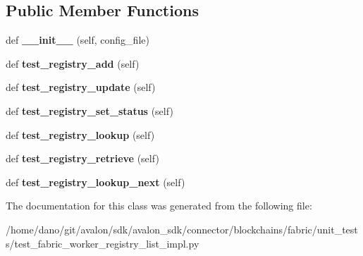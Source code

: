 \subsection*{Public Member Functions}
\begin{DoxyCompactItemize}
\item 
\mbox{\label{classtest__fabric__worker__registry__list__impl_1_1TestFabricWorkerRegistryListImpl_a9442afa1ac61c8fa028e240b4bf49cb9}} 
def {\bfseries \+\_\+\+\_\+init\+\_\+\+\_\+} (self, config\+\_\+file)
\item 
\mbox{\label{classtest__fabric__worker__registry__list__impl_1_1TestFabricWorkerRegistryListImpl_a1f13f2fd74a9d6fd582e77a40f3eaf6f}} 
def {\bfseries test\+\_\+registry\+\_\+add} (self)
\item 
\mbox{\label{classtest__fabric__worker__registry__list__impl_1_1TestFabricWorkerRegistryListImpl_ae7740d4370c55efe9b6550f4d93c0fb3}} 
def {\bfseries test\+\_\+registry\+\_\+update} (self)
\item 
\mbox{\label{classtest__fabric__worker__registry__list__impl_1_1TestFabricWorkerRegistryListImpl_acbeb058b56df6a18205259af93259179}} 
def {\bfseries test\+\_\+registry\+\_\+set\+\_\+status} (self)
\item 
\mbox{\label{classtest__fabric__worker__registry__list__impl_1_1TestFabricWorkerRegistryListImpl_a4cc88021a26a81634da7d96eb5f86959}} 
def {\bfseries test\+\_\+registry\+\_\+lookup} (self)
\item 
\mbox{\label{classtest__fabric__worker__registry__list__impl_1_1TestFabricWorkerRegistryListImpl_aa3c665a7f84f695736be548acd2338cf}} 
def {\bfseries test\+\_\+registry\+\_\+retrieve} (self)
\item 
\mbox{\label{classtest__fabric__worker__registry__list__impl_1_1TestFabricWorkerRegistryListImpl_a425450e6e36f0edc357115609714458f}} 
def {\bfseries test\+\_\+registry\+\_\+lookup\+\_\+next} (self)
\end{DoxyCompactItemize}


The documentation for this class was generated from the following file\+:\begin{DoxyCompactItemize}
\item 
/home/dano/git/avalon/sdk/avalon\+\_\+sdk/connector/blockchains/fabric/unit\+\_\+tests/test\+\_\+fabric\+\_\+worker\+\_\+registry\+\_\+list\+\_\+impl.\+py\end{DoxyCompactItemize}
